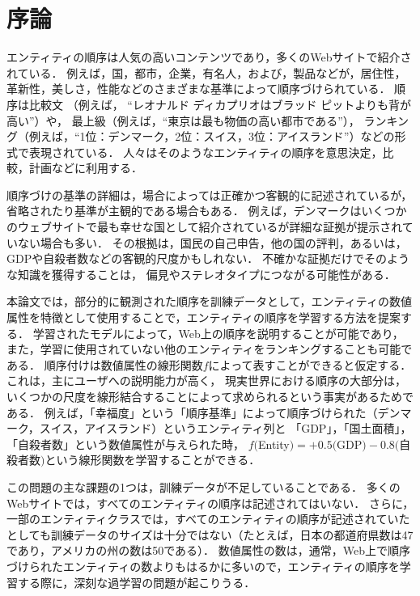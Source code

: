 \chapter{序論}
\label{sq:Introduction}
エンティティの順序は人気の高いコンテンツであり，多くのWebサイトで紹介されている．
例えば，国，都市，企業，有名人，および，製品などが，居住性，革新性，美しさ，性能などのさまざまな基準によって順序づけられている．
順序は比較文
（例えば， ``レオナルド ディカプリオはブラッド ピットよりも背が高い''）や，
最上級（例えば，``東京は最も物価の高い都市である''），
ランキング（例えば，``1位：デンマーク，2位：スイス，3位：アイスランド''）などの形式で表現されている．
人々はそのようなエンティティの順序を意思決定，比較，計画などに利用する．

順序づけの基準の詳細は，場合によっては正確かつ客観的に記述されているが，
省略されたり基準が主観的である場合もある．
例えば，デンマークはいくつかのウェブサイトで最も幸せな国として紹介されているが詳細な証拠が提示されていない場合も多い．
その根拠は，国民の自己申告，他の国の評判，あるいは，
GDPや自殺者数などの客観的尺度かもしれない．
不確かな証拠だけでそのような知識を獲得することは，
偏見やステレオタイプにつながる可能性がある．

本論文では，部分的に観測された順序を訓練データとして，エンティティの数値属性を特徴として使用することで，エンティティの順序を学習する方法を提案する．
学習されたモデルによって，Web上の順序を説明することが可能であり，
また，学習に使用されていない他のエンティティをランキングすることも可能である．
順序付けは数値属性の線形関数$f$によって表すことができると仮定する．
これは，主にユーザへの説明能力が高く，
現実世界における順序の大部分は，いくつかの尺度を線形結合することによって求められるという事実があるためである．
例えば，「幸福度」という「順序基準」によって順序づけられた（デンマーク，スイス，アイスランド）というエンティティ列と
「GDP」，「国土面積」，「自殺者数」という数値属性が与えられた時，
$f($Entity$) = +0.5($GDP$) − 0.8($自殺者数$)$という線形関数を学習することができる．

この問題の主な課題の1つは，訓練データが不足していることである．
多くのWebサイトでは，すべてのエンティティの順序は記述されてはいない．
さらに，一部のエンティティクラスでは，すべてのエンティティの順序が記述されていたとしても訓練データのサイズは十分ではない（たとえば，日本の都道府県数は47であり，アメリカの州の数は50である）．
数値属性の数は，通常，Web上で順序づけられたエンティティの数よりもはるかに多いので，エンティティの順序を学習する際に，深刻な過学習の問題が起こりうる．

